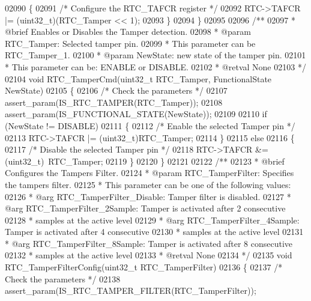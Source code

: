 \begin{DoxyCode}
02090   \{
02091     \textcolor{comment}{/* Configure the RTC\_TAFCR register */}
02092     RTC->TAFCR |= (uint32\_t)(RTC\_Tamper << 1);
02093   \}
02094 \}
02095 
02096 \textcolor{comment}{/**}
02097 \textcolor{comment}{  * @brief  Enables or Disables the Tamper detection.}
02098 \textcolor{comment}{  * @param  RTC\_Tamper: Selected tamper pin.}
02099 \textcolor{comment}{  *          This parameter can be RTC\_Tamper\_1.}
02100 \textcolor{comment}{  * @param  NewState: new state of the tamper pin.}
02101 \textcolor{comment}{  *          This parameter can be: ENABLE or DISABLE.                   }
02102 \textcolor{comment}{  * @retval None}
02103 \textcolor{comment}{  */}
02104 \textcolor{keywordtype}{void} RTC_TamperCmd(uint32\_t RTC\_Tamper, FunctionalState NewState)
02105 \{
02106   \textcolor{comment}{/* Check the parameters */}
02107   assert_param(IS\_RTC\_TAMPER(RTC\_Tamper));
02108   assert_param(IS\_FUNCTIONAL\_STATE(NewState));
02109 
02110   \textcolor{keywordflow}{if} (NewState != DISABLE)
02111   \{
02112     \textcolor{comment}{/* Enable the selected Tamper pin */}
02113     RTC->TAFCR |= (uint32\_t)RTC\_Tamper;
02114   \}
02115   \textcolor{keywordflow}{else}
02116   \{
02117     \textcolor{comment}{/* Disable the selected Tamper pin */}
02118     RTC->TAFCR &= (uint32\_t)~RTC\_Tamper;
02119   \}
02120 \}
02121 
02122 \textcolor{comment}{/**}
02123 \textcolor{comment}{  * @brief  Configures the Tampers Filter.}
02124 \textcolor{comment}{  * @param  RTC\_TamperFilter: Specifies the tampers filter.}
02125 \textcolor{comment}{  *   This parameter can be one of the following values:}
02126 \textcolor{comment}{  *     @arg RTC\_TamperFilter\_Disable: Tamper filter is disabled.}
02127 \textcolor{comment}{  *     @arg RTC\_TamperFilter\_2Sample: Tamper is activated after 2 consecutive }
02128 \textcolor{comment}{  *                                    samples at the active level }
02129 \textcolor{comment}{  *     @arg RTC\_TamperFilter\_4Sample: Tamper is activated after 4 consecutive }
02130 \textcolor{comment}{  *                                    samples at the active level}
02131 \textcolor{comment}{  *     @arg RTC\_TamperFilter\_8Sample: Tamper is activated after 8 consecutive }
02132 \textcolor{comment}{  *                                    samples at the active level }
02133 \textcolor{comment}{  * @retval None}
02134 \textcolor{comment}{  */}
02135 \textcolor{keywordtype}{void} RTC_TamperFilterConfig(uint32\_t RTC\_TamperFilter)
02136 \{
02137   \textcolor{comment}{/* Check the parameters */}
02138   assert_param(IS\_RTC\_TAMPER\_FILTER(RTC\_TamperFilter));

\end{DoxyCode}
